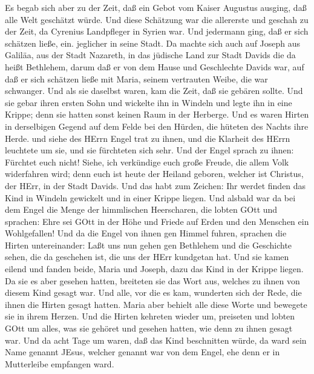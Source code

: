  Es begab sich aber zu der Zeit, daß ein Gebot vom Kaiser
Augustus ausging, daß alle Welt geschätzt würde.  Und diese
Schätzung war die allererste und geschah zu der Zeit, da Cyrenius
Landpfleger in Syrien war.  Und jedermann ging, daß er sich
schätzen ließe, ein. jeglicher in seine Stadt.  Da machte
sich auch auf Joseph aus Galiläa, aus der Stadt Nazareth, in das
jüdische Land zur Stadt Davids die da heißt Bethlehem, darum daß er von
dem Hause und Geschlechte Davids war,  auf daß er sich
schätzen ließe mit Maria, seinem vertrauten Weibe, die war schwanger.
 Und als sie daselbst waren, kam die Zeit, daß sie gebären
sollte.  Und sie gebar ihren ersten Sohn und wickelte ihn in
Windeln und legte ihn in eine Krippe; denn sie hatten sonst keinen Raum
in der Herberge.  Und es waren Hirten in derselbigen Gegend
auf dem Felde bei den Hürden, die hüteten des Nachts ihre Herde.
 und siehe des HErrn Engel trat zu ihnen, und die Klarheit
des HErrn leuchtete um sie, und sie fürchteten sich sehr. 
Und der Engel sprach zu ihnen: Fürchtet euch nicht! Siehe, ich
verkündige euch große Freude, die allem Volk widerfahren wird;
 denn euch ist heute der Heiland geboren, welcher ist
Christus, der HErr, in der Stadt Davids.  Und das habt zum
Zeichen: Ihr werdet finden das Kind in Windeln gewickelt und in einer
Krippe liegen.  Und alsbald war da bei dem Engel die Menge
der himmlischen Heerscharen, die lobten GOtt und sprachen: 
Ehre sei GOtt in der Höhe und Friede auf Erden und den Menschen ein
Wohlgefallen!  Und da die Engel von ihnen gen Himmel
fuhren, sprachen die Hirten untereinander: Laßt uns nun gehen gen
Bethlehem und die Geschichte sehen, die da geschehen ist, die uns der
HErr kundgetan hat.  Und sie kamen eilend und fanden beide,
Maria und Joseph, dazu das Kind in der Krippe liegen.  Da
sie es aber gesehen hatten, breiteten sie das Wort aus, welches zu ihnen
von diesem Kind gesagt war.  Und alle, vor die es kam,
wunderten sich der Rede, die ihnen die Hirten gesagt hatten.
 Maria aber behielt alle diese Worte und bewegete sie in
ihrem Herzen.  Und die Hirten kehreten wieder um, preiseten
und lobten GOtt um alles, was sie gehöret und gesehen hatten, wie denn
zu ihnen gesagt war.  Und da acht Tage um waren, daß das
Kind beschnitten würde, da ward sein Name genannt JEsus, welcher genannt
war von dem Engel, ehe denn er in Mutterleibe empfangen ward.
